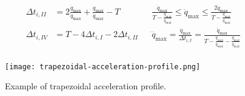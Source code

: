 \begin{itemize}
\begin{align*}
		\Delta t_{i,II} &= 2\frac{\dot{q}_{\max}}{\ddot{q}_{\max}} + \frac{q_{\max}}{\dot{q}_{\max}} -T && \frac{\dot{q}_{\max}}{T - \frac{q_{\max}}{\dot{q}_{\max}}} \leq \ddot{q}_{\max} \leq \frac{2\dot{q}_{\max}}{T - \frac{q_{\max}}{\dot{q}_{\max}}}\\
		\Delta t_{i,IV} &= T - 4 \Delta t_{i,I} - 2 \Delta t_{i,II} && \dddot{q}_{\max} = \frac{\ddot{q}_{\max}}{\Delta t_{i,I}} = \frac{\ddot{q}_{\max}}{T - \frac{\dot{q}_{\max}}{\ddot{q}_{\max}} - \frac{q_{\max}}{\dot{q}_{\max}}}\\
	\end{align*}
	\begin{figure}[hbt!]
		\centering
		\texttt{[image: trapezoidal-acceleration-profile.png]}
		\caption{Example of trapezoidal acceleration profile.}
	\end{figure}
\end{itemize}

